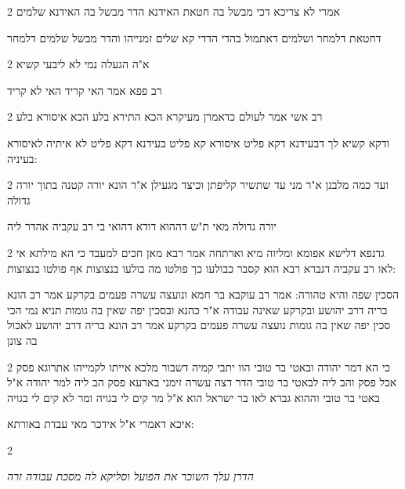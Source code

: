 \documentclass[12pt, openany]{book}
\newcommand{\sethebfont}{
\fontsize{10.5pt}{21.0pt} \selectfont
}
\newcommand{\twocol}[1]{
	{\sethebfont \begin{multicols}{2}
			#1
	\end{multicols}}	
}
\begin{document}
\twocol{אמרי לא צריכא דכי מבשל בה חטאת האידנא הדר מבשל בה האידנא שלמים
\par דחטאת דלמחר ושלמים דאתמול בהדי הדדי קא שלים זמנייהו והדר מבשל שלמים דלמחר}
\twocol{א"ה הגעלה נמי לא ליבעי קשיא
\par רב פפא אמר האי קריד האי לא קריד}
\twocol{רב אשי אמר לעולם כדאמרן מעיקרא הכא התירא בלע הכא איסורא בלע
\par ודקא קשיא לך דבעידנא דקא פליט איסורא קא פליט בעידנא דקא פליט לא איתיה לאיסורא בעיניה:}
\twocol{ועד כמה מלבנן א"ר מני עד שתשיר קליפתן וכיצד מגעילן א"ר הונא יורה קטנה בתוך יורה גדולה
\par יורה גדולה מאי ת"ש דההוא דודא דהואי בי רב עקביה אהדר ליה}
\twocol{גדנפא דלישא אפומא ומליוה מיא וארתחה אמר רבא מאן חכים למעבד כי הא מילתא אי לאו רב עקביה דגברא רבא הוא קסבר כבולעו כך פולטו מה בולעו בנצוצות אף פולטו בנצוצות:
\par הסכין שפה והיא טהורה: אמר רב עוקבא בר חמא ונועצה עשרה פעמים בקרקע אמר רב הונא בריה דרב יהושע ובקרקע שאינה עבודה א"ר כהנא ובסכין יפה שאין בה גומות תניא נמי הכי סכין יפה שאין בה גומות נועצה עשרה פעמים בקרקע אמר רב הונא בריה דרב יהושע לאכול בה צונן}
\twocol{כי הא דמר יהודה ובאטי בר טובי הוו יתבי קמיה דשבור מלכא אייתו לקמייהו אתרוגא פסק אכל פסק והב ליה לבאטי בר טובי הדר דצה עשרה זימני בארעא פסק הב ליה למר יהודה א"ל באטי בר טובי וההוא גברא לאו בר ישראל הוא א"ל מר קים לי בגויה ומר לא קים לי בגויה
\par איכא דאמרי א"ל אידכר מאי עבדת באורתא:}
\twocol{\par \par {\large\emph{הדרן עלך השוכר את הפועל וסליקא לה מסכת עבודה זרה}}\par \par }
\end{document}
